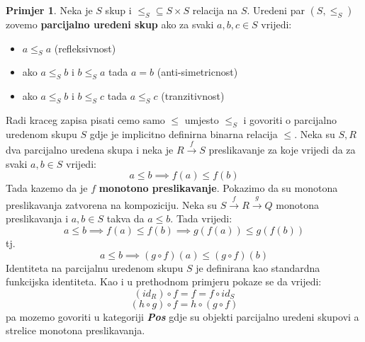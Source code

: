 \documentclass[11pt]{article}
\newcommand{\category}[1]{\textbf{\emph{#1}}}
\theoremstyle{definition}
\newtheorem{primjer}{Primjer}
\begin{document}
  \begin{primjer}
    Neka je $S$ skup i $\leq_S \subseteq S \times S$ relacija na $S$. Uredeni par $(S,
    \leq_S)$ zovemo \textbf{parcijalno uredeni skup} ako za svaki $a, b, c \in S$
    vrijedi:
    \begin{itemize}
      \item $a \leq_S a$ (refleksivnost)
      \item ako $a \leq_S b$ i $b \leq_S a$ tada $a = b$ (anti-simetricnost)
      \item ako $a \leq_S b$ i $b \leq_S c$ tada $a \leq_S c$ (tranzitivnost)
    \end{itemize}
    Radi kraceg zapisa pisati cemo samo $\leq$ umjesto $\leq_S$ i
  govoriti o parcijalno uredenom skupu $S$ gdje je implicitno definirna
  binarna relacija $\leq$.
  Neka su $S, R$ dva parcijalno uredena skupa i neka je $R \xrightarrow{f} S$
  preslikavanje za koje vrijedi da za svaki $a, b \in S$ vrijedi:
  \begin{equation*}
    a \leq b \implies f(a) \leq f(b)
  \end{equation*}
  Tada kazemo da je $f$ \textbf{monotono preslikavanje}.
  Pokazimo da su monotona preslikavanja zatvorena na kompoziciju.
  Neka su $S \xrightarrow{f} R \xrightarrow{g} Q$ monotona preslikavanja i $a,
  b \in S$ takva da $a \leq b$. Tada vrijedi:
  \begin{equation*}
    a \leq b \implies f(a) \leq f(b) \implies g(f(a)) \leq g(f(b))
  \end{equation*}
  tj.
  \begin{equation*}
    a \leq b \implies (g \circ f)(a) \leq (g \circ f)(b)
  \end{equation*}
  Identiteta na parcijalnu uredenom skupu $S$ je definirana kao standardna
  funkcijska identiteta. Kao i u prethodnom primjeru pokaze se da vrijedi:
  \begin{equation*}
    (id_R) \circ f = f = f \circ id_S
  \end{equation*}
  \begin{equation*}
    (h \circ g) \circ f = h \circ (g \circ f)
  \end{equation*}
  pa mozemo govoriti u kategoriji \category{Pos} gdje su objekti parcijalno
  uredeni skupovi a strelice monotona preslikavanja.
  \end{primjer}
\end{document}
